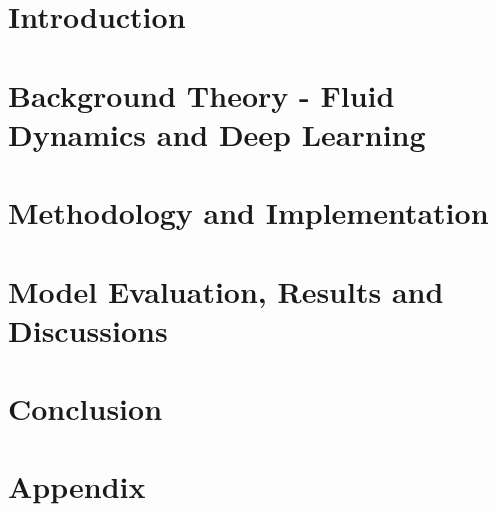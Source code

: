 
\addtolength{\evensidemargin}{-12mm}

%
%
\part[Introduction]{Introduction}
\label{part:Intro}


\part[Theory]{Background Theory - Fluid Dynamics and Deep Learning}
\label{part:Theory}


\part[Methodology]{Methodology and Implementation}
\label{part:Method}

\part[Model Evaluation]{Model Evaluation, Results and Discussions}
\label{part:Results}

\part[Conclusion]{Conclusion}
\label{part:Conclusion}

%
%
\part*{Appendix}

\appendix %



